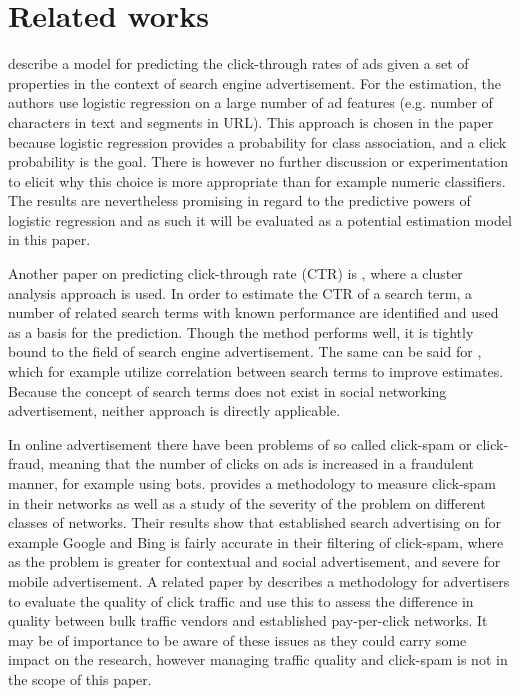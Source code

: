 \documentclass{sig-alternate}
\begin{document}
\section{Related works}
\label{ch:RelatedWorks}
\cite{Richardson2007} describe a model for predicting the click-through rates of ads given a set of properties in the context of search engine advertisement. For the estimation, the authors use logistic regression on a large number of ad features (e.g. number of characters in text and segments in URL). This approach is chosen in the paper because logistic regression provides a probability for class association, and a click probability is the goal. There is however no further discussion or experimentation to elicit why this choice is more appropriate than for example numeric classifiers. The results are nevertheless promising in regard to the predictive powers of logistic regression and as such it will be evaluated as a potential estimation model in this paper.

Another paper on predicting click-through rate (CTR) is \cite{Regelson2006}, where a cluster analysis approach is used. In order to estimate the CTR of a search term, a number of related search terms with known performance are identified and used as a basis for the prediction. Though the method performs well, it is tightly bound to the field of search engine advertisement. The same can be said for \cite{Richardson2007}, which for example utilize correlation between search terms to improve estimates. Because the concept of search terms does not exist in social networking advertisement, neither approach is directly applicable.

In online advertisement there have been problems of so called click-spam or click-fraud, meaning that the number of clicks on ads is increased in a fraudulent manner, for example using bots. \cite{Dave2012} provides a methodology to measure click-spam in their networks as well as a study of the severity of the problem on different classes of networks. Their results show that established search advertising on for example Google and Bing is fairly accurate in their filtering of click-spam, where as the problem is  greater for contextual and social advertisement, and severe for mobile advertisement. A related paper by \cite{Zhang2011} describes a methodology for advertisers to evaluate the quality of click traffic and use this to assess the difference in quality between bulk traffic vendors and established pay-per-click networks. It may be of importance to be aware of these issues as they could carry some impact on the research, however managing traffic quality and click-spam is not in the scope of this paper.
\end{document}
